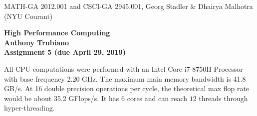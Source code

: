\documentclass[11pt]{article}
\begin{document}
\begin{center}
  \vspace*{-2cm}
{\small MATH-GA 2012.001 and CSCI-GA 2945.001, Georg Stadler \&
  Dhairya Malhotra (NYU Courant)}
\end{center}
\vspace*{.5cm}
\begin{center}
\large \textbf{%
High Performance Computing \\
Anthony Trubiano \\
Assignment 5 (due April 29, 2019) }
\end{center}


 All CPU computations were performed with an Intel Core i7-8750H Processor with base frequency 2.20 GHz. The maximum main memory bandwidth is 41.8 GB/s. At 16 double 
precision operations per cycle, the theoretical max flop rate would be about 35.2 GFlops/s. It has $6$ cores and can reach $12$ threads through hyper-threading. 
\end{document}
